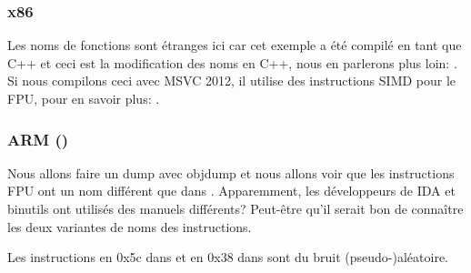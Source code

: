

\subsubsection{x86}



Les noms de fonctions sont étranges ici car cet exemple a été compilé en tant que
C++ et ceci est la modification des noms en C++, nous en parlerons plus loin: .
Si nous compilons ceci avec MSVC 2012, il utilise des instructions SIMD pour le FPU,
pour en savoir plus: .

\iffalse
A BUG HERE
\subsubsection{MIPS}



Il y a aussi une instruction \INS{LUI} inutile, ajoutée pour quelque étrange raison.
Nous avons déjà considéré cet artefact plus tôt: \myref{MIPS_FPU_LUI}.
\fi

\subsubsection{ARM (\ARMMode)}




Nous allons faire un dump avec objdump et nous allons voir que les instructions FPU
ont un nom différent que dans \IDA.
Apparemment, les développeurs de IDA et binutils ont utilisés des manuels différents?
Peut-être qu'il serait bon de connaître les deux variantes de noms des instructions.



Les instructions en 0x5c dans  et en 0x38 dans \main sont du bruit
(pseudo-)aléatoire.

